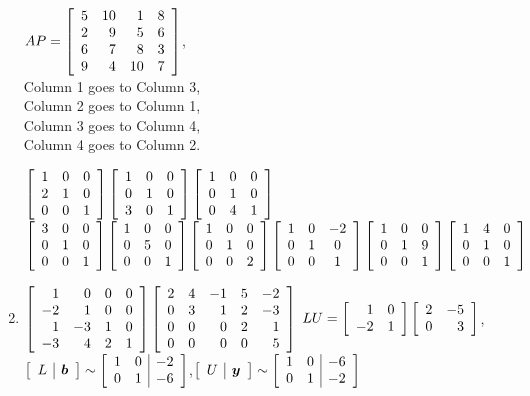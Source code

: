 \begin{enumerate}[!HW!, start=1]
\begin{multicols}{2}
$AP = \mtx{rrrr}{5&10&1&8\\2&9&5&6\\6&7&8&3\\9&4&10&7}$,\\ Column 1 goes to Column 3,\\ Column 2 goes to Column 1,\\ Column 3 goes to Column 4,\\ Column 4 goes to Column 2.
\end{multicols}%

\itemspade $\mtx{ccc}{1&0&0\\2&1&0\\0&0&1}\mtx{ccc}{1&0&0\\0&1&0\\3&0&1}\mtx{ccc}{1&0&0\\0&1&0\\0&4&1}$
\itemspade $\mtx{ccc}{3&0&0\\0&1&0\\0&0&1}\mtx{ccc}{1&0&0\\0&5&0\\0&0&1}\mtx{ccc}{1&0&0\\0&1&0\\0&0&2}\mtx{ccc}{1&0&-2\\0&1&0\\0&0&1}\mtx{ccc}{1&0&0\\0&1&9\\0&0&1}\mtx{ccc}{1&4&0\\0&1&0\\0&0&1}$

\item $\mtx{rrrr}{1&0&0&0\\-2&1&0&0\\1&-3&1&0\\-3&4&2&1}\mtx{rrrrr}{2&4&-1&5&-2\\0&3&1&2&-3\\0&0&0&2&1\\0&0&0&0&5}$ %
\itemspade $LU = \mtx{rr}{1&0\\-2&1}\mtx{rr}{2&-5\\0&3}$,\quad $\mtx{c|c}{L & \bb b} %
\sim \mtx{cc|c}{1&0&-2\\0&1&-6}$,\quad $\mtx{c|c}{U & \bb y} %
\sim \mtx{cc|r}{1&0&-6\\0&1&-2}$


\end{enumerate}

